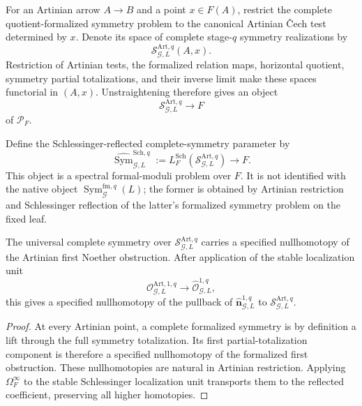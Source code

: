 \begin{construction}
\label{constr:symmetry-noether-artinian-complete-symmetry-presheaf-over-the-formal-leaf}
For an Artinian arrow $A\to B$ and a point $x\in F(A)$, restrict the complete
quotient-formalized symmetry problem to the canonical Artinian \v{C}ech test
determined by $x$.  Denote its space of complete stage-$q$ symmetry realizations by
\[
\mathcal S_{\mathcal G,L}^{\mathrm{Art},q}(A,x).
\]
Restriction of Artinian tests, the formalized relation maps, horizontal quotient,
symmetry partial totalizations, and their inverse limit make these spaces functorial in
$(A,x)$.  Unstraightening therefore gives an object
\[
\mathcal S_{\mathcal G,L}^{\mathrm{Art},q}
\longrightarrow F
\]
of $\mathcal P_F$.

Define the Schlessinger-reflected complete-symmetry parameter by
\[
\boxed{
\widehat{\operatorname{Sym}}_{\mathcal G,L}^{\mathrm{Sch},q}
:=
L_F^{\mathrm{Sch}}
\left(
\mathcal S_{\mathcal G,L}^{\mathrm{Art},q}
\right)
\longrightarrow F .
}
\]
This object is a spectral formal-moduli problem over $F$.  It is not identified
with the native object
$\operatorname{Sym}_{\mathcal G}^{\mathrm{fm},q}(L)$; the former is obtained by
Artinian restriction and Schlessinger reflection of the latter's formalized
symmetry problem on the fixed leaf.
\end{construction}

\begin{proposition}
\label{prop:symmetry-noether-compatibility-with-the-formalized-first-obstruction}
The universal complete symmetry over
$\mathcal S_{\mathcal G,L}^{\mathrm{Art},q}$ carries a specified nullhomotopy of
the Artinian first Noether obstruction.  After application of the stable
localization unit
\[
\mathcal O_{\mathcal G,L}^{\mathrm{Art},1,q}
\longrightarrow
\widehat{\mathcal O}_{\mathcal G,L}^{1,q},
\]
this gives a specified nullhomotopy of the pullback of
$\widehat{\mathbf n}_{\mathcal G,L}^{1,q}$ to
$\mathcal S_{\mathcal G,L}^{\mathrm{Art},q}$.
\end{proposition}

\begin{proof}
At every Artinian point, a complete formalized symmetry is by definition a lift
through the full symmetry totalization.  Its first partial-totalization component is
therefore a specified nullhomotopy of the formalized first obstruction.  These
nullhomotopies are natural in Artinian restriction.  Applying
$\Omega_F^\infty$ to the stable Schlessinger localization unit transports them to
the reflected coefficient, preserving all higher homotopies.
\end{proof}

